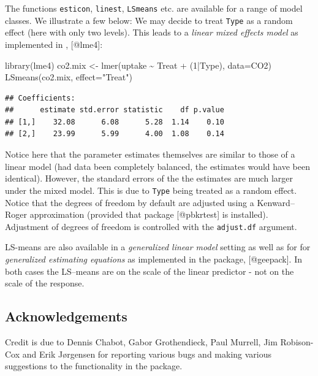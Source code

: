 \documentclass[
]{article}
\newenvironment{Shaded}{\begin{snugshade}}{\end{snugshade}}
\newcommand{\AttributeTok}[1]{\textcolor[rgb]{0.77,0.63,0.00}{#1}}
\newcommand{\DecValTok}[1]{\textcolor[rgb]{0.00,0.00,0.81}{#1}}
\newcommand{\FunctionTok}[1]{\textcolor[rgb]{0.00,0.00,0.00}{#1}}
\newcommand{\NormalTok}[1]{#1}
\newcommand{\OtherTok}[1]{\textcolor[rgb]{0.56,0.35,0.01}{#1}}
\newcommand{\SpecialCharTok}[1]{\textcolor[rgb]{0.00,0.00,0.00}{#1}}
\newcommand{\StringTok}[1]{\textcolor[rgb]{0.31,0.60,0.02}{#1}}
\begin{document}
The functions \texttt{esticon}, \texttt{linest}, \texttt{LSmeans} etc.
are available for a range of model classes. We illustrate a few below:
We may decide to treat \verb|Type| as a random effect (here with only
two levels). This leads to a \emph{linear mixed effects model} as
implemented in , {[}@lme4{]}:

\begin{Shaded}
\begin{Highlighting}[]
\FunctionTok{library}\NormalTok{(lme4)}
\NormalTok{co2.mix }\OtherTok{\textless{}{-}} \FunctionTok{lmer}\NormalTok{(uptake }\SpecialCharTok{\textasciitilde{}}\NormalTok{ Treat }\SpecialCharTok{+}\NormalTok{ (}\DecValTok{1}\SpecialCharTok{|}\NormalTok{Type), }\AttributeTok{data=}\NormalTok{CO2)}
\FunctionTok{LSmeans}\NormalTok{(co2.mix, }\AttributeTok{effect=}\StringTok{"Treat"}\NormalTok{)}
\end{Highlighting}
\end{Shaded}

\begin{verbatim}
## Coefficients:
##      estimate std.error statistic    df p.value
## [1,]    32.08      6.08      5.28  1.14    0.10
## [2,]    23.99      5.99      4.00  1.08    0.14
\end{verbatim}

Notice here that the parameter estimates themselves are similar to those
of a linear model (had data been completely balanced, the estimates
would have been identical). However, the standard errors of the the
estimates are much larger under the mixed model. This is due to
\texttt{Type} being treated as a random effect. Notice that the degrees
of freedom by default are adjusted using a Kenward--Roger approximation
(provided that  package {[}@pbkrtest{]} is installed).
Adjustment of degrees of freedom is controlled with the
\texttt{adjust.df} argument.

LS-means are also available in a \emph{generalized linear model} setting
as well as for for \emph{generalized estimating equations} as
implemented in the  package, {[}@geepack{]}. In both
cases the LS--means are on the scale of the linear predictor - not on
the scale of the response.

\hypertarget{acknowledgements}{%
\subsection{Acknowledgements}\label{acknowledgements}}

Credit is due to Dennis Chabot, Gabor Grothendieck, Paul Murrell, Jim
Robison-Cox and Erik Jørgensen for reporting various bugs and making
various suggestions to the functionality in the  package.


\end{document}
